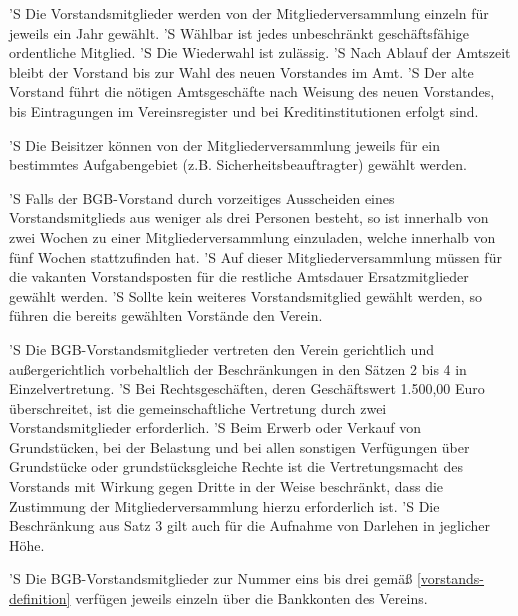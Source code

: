 \documentclass[a4paper,10pt]{scrreprt}
\begin{document}
\begin{contract}
'S Die Vorstandsmitglieder werden von der Mitgliederversammlung einzeln für
jeweils ein Jahr gewählt.
'S Wählbar ist jedes unbeschränkt geschäftsfähige ordentliche Mitglied.
'S Die Wiederwahl ist zulässig.
'S Nach Ablauf der Amtszeit bleibt der Vorstand bis zur Wahl des
neuen Vorstandes im Amt.
'S Der alte Vorstand führt die nötigen Amtsgeschäfte nach Weisung des neuen
Vorstandes, bis Eintragungen im Vereinsregister und bei Kreditinstitutionen
erfolgt sind.

'S Die Beisitzer können von der Mitgliederversammlung jeweils für ein
bestimmtes Aufgabengebiet (z.B. Sicherheitsbeauftragter) gewählt werden.

'S Falls der BGB-Vorstand durch vorzeitiges Ausscheiden eines Vorstandsmitglieds
aus weniger als drei Personen besteht, so ist innerhalb von zwei Wochen zu
einer Mitgliederversammlung einzuladen, welche innerhalb von fünf Wochen
stattzufinden hat.
'S Auf dieser Mitgliederversammlung müssen für die vakanten Vorstandsposten für
die restliche Amtsdauer Ersatzmitglieder gewählt werden.
'S Sollte kein weiteres Vorstandsmitglied gewählt werden, so führen die bereits
gewählten Vorstände den Verein.

'S Die BGB-Vorstandsmitglieder vertreten den Verein gerichtlich und
außergerichtlich vorbehaltlich der Beschränkungen in den Sätzen 2 bis 4 in
Einzelvertretung.
'S Bei Rechtsgeschäften, deren Geschäftswert 1.500,00 Euro überschreitet, ist
die gemeinschaftliche Vertretung durch zwei Vorstandsmitglieder erforderlich.
'S Beim Erwerb oder Verkauf von Grundstücken, bei der Belastung und bei allen
sonstigen Verfügungen über Grundstücke oder grundstücksgleiche Rechte ist die
Vertretungsmacht des Vorstands mit Wirkung gegen Dritte in der Weise
beschränkt, dass die Zustimmung der Mitgliederversammlung hierzu erforderlich
ist.
'S Die Beschränkung aus Satz 3 gilt auch für die Aufnahme von Darlehen in
jeglicher Höhe.

'S Die BGB-Vorstandsmitglieder zur Nummer eins bis drei gemäß
\ref{vorstands-definition} verfügen jeweils einzeln über die Bankkonten des
Vereins.


\end{contract}
\end{document}
